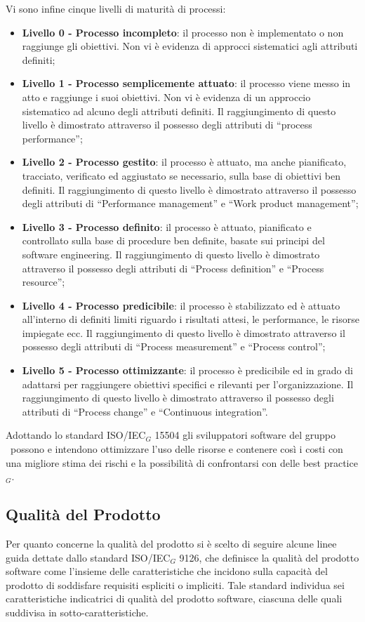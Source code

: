 \smallskip
Vi sono infine cinque livelli di maturità di processi:
\smallskip
\begin{itemize}
	\item \textbf{Livello 0 - Processo incompleto}: il processo non è implementato o non raggiunge gli obiettivi. Non vi è evidenza di approcci sistematici agli
	attributi definiti;
	\item \textbf{Livello 1 - Processo semplicemente attuato}: il processo viene messo in atto e raggiunge i suoi obiettivi. Non vi è evidenza di un approccio sistematico ad alcuno degli attributi definiti. Il raggiungimento di questo livello è dimostrato attraverso il possesso degli attributi di ``process performance'';
	\item \textbf{Livello 2 - Processo gestito}: il processo è attuato, ma anche pianificato, tracciato, verificato ed aggiustato se necessario, sulla base di obiettivi ben definiti. Il raggiungimento di questo livello è dimostrato attraverso il possesso degli attributi di ``Performance management'' e ``Work product management'';
	\item \textbf{Livello 3 - Processo definito}: il processo è attuato, pianificato e controllato sulla base di procedure ben definite, basate sui principi del software engineering. Il raggiungimento di questo livello è dimostrato attraverso il possesso degli attributi di ``Process definition'' e ``Process resource'';
	\item \textbf{Livello 4 - Processo predicibile}: il processo è stabilizzato ed è attuato all'interno di definiti limiti riguardo i risultati attesi, le performance, le	risorse impiegate ecc. Il raggiungimento di questo livello è dimostrato attraverso il possesso degli attributi di ``Process measurement'' e ``Process control'';
	\item \textbf{Livello 5 - Processo ottimizzante}: il processo è predicibile ed in grado di adattarsi per raggiungere obiettivi specifici e rilevanti per l'organizzazione. Il raggiungimento di questo livello è dimostrato attraverso il possesso degli attributi di ``Process change'' e ``Continuous integration''.
\end{itemize}
Adottando lo standard ISO/IEC$_G$ 15504 gli sviluppatori software del gruppo \gruppo\ possono e intendono ottimizzare l'uso delle risorse e contenere così i costi con una migliore stima dei rischi e la possibilità di confrontarsi con delle best practice$_G$.

\subsection{Qualità del Prodotto}
Per quanto concerne la qualità del prodotto si è scelto di seguire alcune linee
guida dettate dallo standard ISO/IEC$_G$ 9126, che definisce la qualità del
prodotto software come l'insieme delle caratteristiche che incidono sulla capacità del prodotto di soddisfare requisiti espliciti o impliciti. Tale standard individua sei caratteristiche indicatrici di qualità del prodotto software, ciascuna delle quali suddivisa in sotto-caratteristiche.
